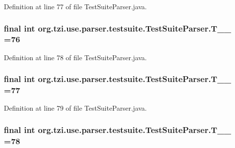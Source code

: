 Definition at line 77 of file Test\-Suite\-Parser.\-java.

\hypertarget{classorg_1_1tzi_1_1use_1_1parser_1_1testsuite_1_1_test_suite_parser_a705ee77da9ae9a4f2f041bf01c4f8fcb}{
\subsubsection[{T\-\_\-\-\_\-76}]{\setlength{\rightskip}{0pt plus 5cm}final int org.\-tzi.\-use.\-parser.\-testsuite.\-Test\-Suite\-Parser.\-T\-\_\-\-\_ =76\hspace{0.3cm}{\ttfamily [static]}}}\label{classorg_1_1tzi_1_1use_1_1parser_1_1testsuite_1_1_test_suite_parser_a705ee77da9ae9a4f2f041bf01c4f8fcb}


Definition at line 78 of file Test\-Suite\-Parser.\-java.

\hypertarget{classorg_1_1tzi_1_1use_1_1parser_1_1testsuite_1_1_test_suite_parser_ab3f069b5903ca2411c2217961ef2ff70}{
\subsubsection[{T\-\_\-\-\_\-77}]{\setlength{\rightskip}{0pt plus 5cm}final int org.\-tzi.\-use.\-parser.\-testsuite.\-Test\-Suite\-Parser.\-T\-\_\-\-\_ =77\hspace{0.3cm}{\ttfamily [static]}}}\label{classorg_1_1tzi_1_1use_1_1parser_1_1testsuite_1_1_test_suite_parser_ab3f069b5903ca2411c2217961ef2ff70}


Definition at line 79 of file Test\-Suite\-Parser.\-java.

\hypertarget{classorg_1_1tzi_1_1use_1_1parser_1_1testsuite_1_1_test_suite_parser_ae181defe28f6d422de99cdb0031ff4a9}{
\subsubsection[{T\-\_\-\-\_\-78}]{\setlength{\rightskip}{0pt plus 5cm}final int org.\-tzi.\-use.\-parser.\-testsuite.\-Test\-Suite\-Parser.\-T\-\_\-\-\_ =78\hspace{0.3cm}{\ttfamily [static]}}}\label{classorg_1_1tzi_1_1use_1_1parser_1_1testsuite_1_1_test_suite_parser_ae181defe28f6d422de99cdb0031ff4a9}


